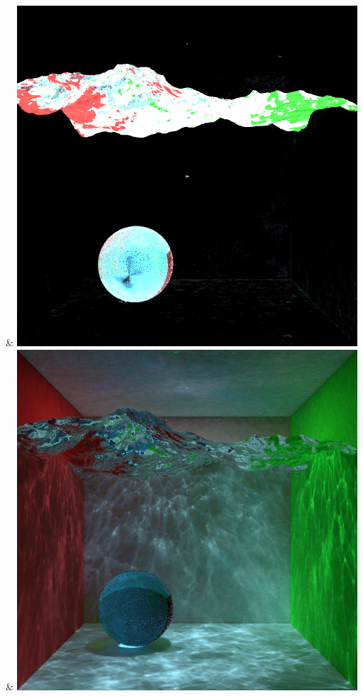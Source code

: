 & \includegraphics[width=\linewidth]{figures/py/tests/quality_comparison/nrc+lt+bal_1spp_caustics_small.png}
& \includegraphics[width=\linewidth]{figures/py/tests/quality_comparison/nrc+sppc_1spp_caustics_small.png}
